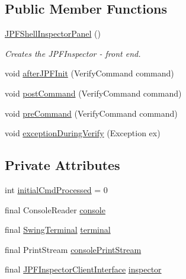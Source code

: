 \subsection*{Public Member Functions}
\begin{DoxyCompactItemize}
\item 
\hyperlink{classgov_1_1nasa_1_1jpf_1_1inspector_1_1frontends_1_1jpfshell_1_1_j_p_f_shell_inspector_panel_ab5ea7568f67e296e4de5f2e37e4f99ff}{J\+P\+F\+Shell\+Inspector\+Panel} ()
\begin{DoxyCompactList}\small\item\em Creates the J\+P\+F\+Inspector -\/ front end. \end{DoxyCompactList}\item 
void \hyperlink{classgov_1_1nasa_1_1jpf_1_1inspector_1_1frontends_1_1jpfshell_1_1_j_p_f_shell_inspector_panel_a9479c7cee608d569b9d7f3cac371c541}{after\+J\+P\+F\+Init} (Verify\+Command command)
\item 
void \hyperlink{classgov_1_1nasa_1_1jpf_1_1inspector_1_1frontends_1_1jpfshell_1_1_j_p_f_shell_inspector_panel_a3bd4a68021247210d22be98d009939a5}{post\+Command} (Verify\+Command command)
\item 
void \hyperlink{classgov_1_1nasa_1_1jpf_1_1inspector_1_1frontends_1_1jpfshell_1_1_j_p_f_shell_inspector_panel_ae0b4cda543ee145fbaafda2886293100}{pre\+Command} (Verify\+Command command)
\item 
void \hyperlink{classgov_1_1nasa_1_1jpf_1_1inspector_1_1frontends_1_1jpfshell_1_1_j_p_f_shell_inspector_panel_a56ef36c4e5ce9a18932aba4ebd992e3c}{exception\+During\+Verify} (Exception ex)
\end{DoxyCompactItemize}
\subsection*{Private Attributes}
\begin{DoxyCompactItemize}
\item 
int \hyperlink{classgov_1_1nasa_1_1jpf_1_1inspector_1_1frontends_1_1jpfshell_1_1_j_p_f_shell_inspector_panel_adb82f57985a52a65886090f3473362cd}{initial\+Cmd\+Processed} = 0
\item 
final Console\+Reader \hyperlink{classgov_1_1nasa_1_1jpf_1_1inspector_1_1frontends_1_1jpfshell_1_1_j_p_f_shell_inspector_panel_a50dbdb23f406e62ef9dc75d50f72549a}{console}
\item 
final \hyperlink{classgov_1_1nasa_1_1jpf_1_1inspector_1_1frontends_1_1jpfshell_1_1gui_1_1_swing_terminal}{Swing\+Terminal} \hyperlink{classgov_1_1nasa_1_1jpf_1_1inspector_1_1frontends_1_1jpfshell_1_1_j_p_f_shell_inspector_panel_a444a1b705fa48380375e7a920a140337}{terminal}
\item 
final Print\+Stream \hyperlink{classgov_1_1nasa_1_1jpf_1_1inspector_1_1frontends_1_1jpfshell_1_1_j_p_f_shell_inspector_panel_a736b2f57f5e00c303d0f39b95ea20881}{console\+Print\+Stream}
\item 
final \hyperlink{interfacegov_1_1nasa_1_1jpf_1_1inspector_1_1client_1_1_j_p_f_inspector_client_interface}{J\+P\+F\+Inspector\+Client\+Interface} \hyperlink{classgov_1_1nasa_1_1jpf_1_1inspector_1_1frontends_1_1jpfshell_1_1_j_p_f_shell_inspector_panel_acecd6528a364612136bc7cf50bd89e69}{inspector}
\end{DoxyCompactItemize}
